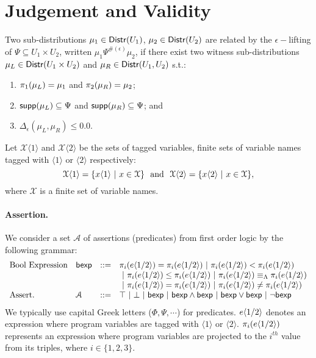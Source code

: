 \documentclass[a4paper,11pt]{article}
\begin{document}
\section{Judgement and Validity}
%
\begin{defn}
Two sub-distributions $\mu_1 \in \mathsf{Distr}(U_1)$, $\mu_2 \in \mathsf{Distr}(U_2)$ are related by the $\epsilon-$lifting of $\Psi \subseteq U_1 \times U_2$, written $\mu_1 \Psi^{\#(\epsilon)} \mu_2$, if there exist two witness sub-distributions $\mu_L \in \mathsf{Distr}(U_1 \times U_2)$ and $\mu_R \in \mathsf{Distr}(U_1, U_2)$ s.t.:
\begin{enumerate}
	\item $\pi_1(\mu_L) = \mu_1$ and $\pi_2(\mu_R) = \mu_2$;
	\item $\mathsf{supp}(\mu_L) \subseteq \Psi$ and $\mathsf{supp}(\mu_R) \subseteq \Psi$; and
	\item $\Delta_{\epsilon}(\mu_L, \mu_R) \leq 0.0$.
\end{enumerate}
\end{defn}
%
\begin{defn}
Let $\mathcal{X}\langle 1 \rangle$ and $\mathcal{X}\langle 2 \rangle$ be the sets of tagged variables, finite sets of variable names tagged with $\langle 1 \rangle$ or $\langle 2 \rangle$ respectively:
\[
	\mathcal{X}\langle 1 \rangle = \{x\langle 1 \rangle ~|~ x \in \mathcal{X}\}
	~~
	\text{and}
	~~
	\mathcal{X}\langle 2 \rangle = \{x\langle 2 \rangle ~|~ x \in \mathcal{X}\},
\]
where $\mathcal{X}$ is a finite set of variable names.
\end{defn}
%
\paragraph{Assertion.} We consider a set $\mathcal{A}$ of assertions (predicates) from first order logic by the following grammar:
\[
\begin{array}{llll}
%
\mbox{Bool Expression} & \bexp & :: = & 
\pi_i(\expr\langle 1 / 2 \rangle) = \pi_i(\expr\langle 1 / 2 \rangle)  
 ~|~ \pi_i(\expr\langle 1 / 2 \rangle) < \pi_i(\expr\langle 1 / 2 \rangle) \\
 & & &
 ~|~ \pi_i(\expr\langle 1 / 2 \rangle) \leq \pi_i(\expr\langle 1 / 2 \rangle)
 ~|~ \pi_i(\expr\langle 1 / 2 \rangle) \lameq \pi_i(\expr\langle 1 / 2 \rangle)
	\\
& & &
 ~|~ \pi_i(\expr\langle 1 / 2 \rangle) = \pi_i(\expr\langle 1 / 2 \rangle)
 ~|~ \pi_i(\expr\langle 1 / 2 \rangle) \neq \pi_i(\expr\langle 1 / 2 \rangle)
	\\
%
\mbox{Assert.} & \mathcal{A} & ::= & \top ~|~ \bot ~|~ \bexp 
	~|~ \bexp \land \bexp ~|~ \bexp \lor \bexp ~|~ \neg \bexp
\end{array}
\]
%
We typically use capital Greek letters ($\Phi, \Psi, \cdots$) for predicates. 
%
$e\langle 1 / 2 \rangle$ denotes an expression where program variables are tagged with $\langle 1 \rangle$ or $\langle 2 \rangle$.
%
$\pi_i(e\langle 1 / 2 \rangle)$ represents an expression where program variables are projected to the $i^{th}$ value from its triples, where $i \in \{1, 2, 3\}$.
%
\end{document}
